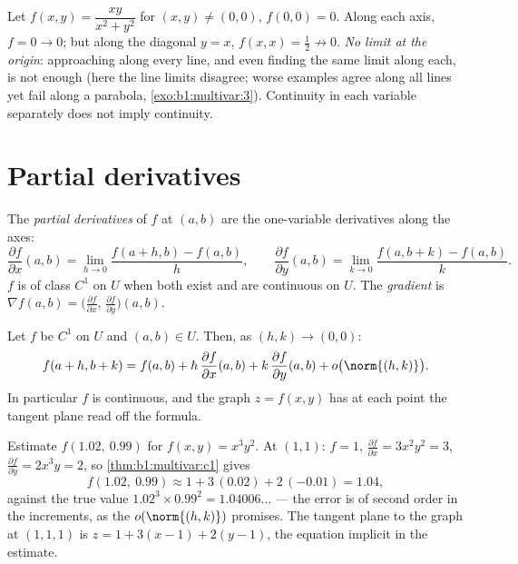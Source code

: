 \begin{example}\label{ex:b1:multivar:trap}
Let $f(x, y) = \dfrac{xy}{x^2 + y^2}$ for $(x,y) \neq (0,0)$, $f(0,
0) = 0$. Along each axis, $f = 0 \to 0$; but along the diagonal $y
= x$, $f(x, x) = \frac12 \not\to 0$. \emph{No limit at the origin}:
approaching along every line, and even finding the same limit along
each, is not enough (here the line limits disagree; worse examples
agree along all lines yet fail along a parabola,
\cref{exo:b1:multivar:3}). Continuity in each variable separately
does not imply continuity.
\end{example}

\section{Partial derivatives}

\begin{definition}\label{def:b1:multivar:partial}
The \emph{partial derivatives} of $f$ at
$(a, b)$ are the one-variable derivatives along the axes:
\[
\frac{\partial f}{\partial x}(a,b)
= \lim_{h \to 0} \frac{f(a + h, b) - f(a,b)}{h},
\qquad
\frac{\partial f}{\partial y}(a,b)
= \lim_{k \to 0} \frac{f(a, b + k) - f(a,b)}{k}.
\]
$f$ is of class $C^1$ on $U$ when both exist and are continuous on
$U$. The \emph{gradient} is $\nabla f(a,b) =
\bigl(\frac{\partial f}{\partial x},\, \frac{\partial f}{\partial
y}\bigr)(a,b)$.
\end{definition}

\begin{theorem}\label{thm:b1:multivar:c1}
Let $f$ be $C^1$ on $U$ and $(a,b) \in U$. Then, as $(h, k) \to
(0,0)$:
\[
f(a + h, b + k) = f(a, b)
+ h\,\frac{\partial f}{\partial x}(a,b)
+ k\,\frac{\partial f}{\partial y}(a,b)
+ o\bigl(\norm{(h,k)}\bigr) .
\]
In particular $f$ is continuous, and the graph $z = f(x,y)$ has at
each point the tangent plane read off the formula.
\end{theorem}

\begin{example}
\label{ex:b1:multivar:linapprox}
Estimate $f(1.02,\ 0.99)$ for $f(x, y) = x^3y^2$. At $(1, 1)$:
$f = 1$, $\frac{\partial f}{\partial x} = 3x^2y^2 = 3$,
$\frac{\partial f}{\partial y} = 2x^3y = 2$, so
\cref{thm:b1:multivar:c1} gives
\[
f(1.02,\ 0.99) \approx 1 + 3\,(0.02) + 2\,(-0.01) = 1.04 ,
\]
against the true value $1.02^3 \times 0.99^2 = 1.04006\dots$ ---
the error is of second order in the increments, as the
$o(\norm{(h,k)})$ promises. The tangent plane to the graph at
$(1, 1, 1)$ is $z = 1 + 3(x - 1) + 2(y - 1)$, the equation
implicit in the estimate.
\end{example}


